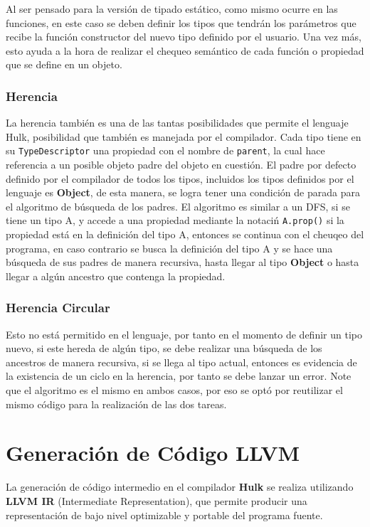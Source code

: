 \documentclass[11pt, a4paper, twoside]{article} %
\begin{document}
Al ser pensado para la versi\'on de tipado est\'atico, como mismo ocurre en las funciones, en este caso se deben definir los tipos que tendr\'an los 
par\'ametros que recibe la funci\'on constructor del nuevo tipo definido por el usuario.  Una vez m\'as, esto ayuda a la hora de realizar el chequeo 
sem\'antico de cada funci\'on o propiedad que se define en un objeto. 

\subsubsection{Herencia}
La herencia tambi\'en es una de las tantas posibilidades que permite el lenguaje Hulk, posibilidad que tambi\'en es manejada por el compilador. Cada tipo
tiene en su \texttt{TypeDescriptor} una propiedad con el nombre de \texttt{parent}, la cual hace referencia a un posible objeto padre del objeto en cuesti\'on.
El padre por defecto definido por el compilador de todos los tipos, incluidos los tipos definidos por el lenguaje es \textbf{Object}, de esta manera, se logra 
tener una condici\'on de parada para el algoritmo de b\'usqueda de los padres. El algoritmo es similar a un DFS, si se tiene un tipo A, y accede a una propiedad
mediante la notaci\'n \texttt{A.prop()} si la propiedad est\'a en la definici\'on del tipo A, entonces se continua con el cheuqeo del programa,
en caso contrario se busca la definici\'on del tipo A y se hace una b\'usqueda de sus padres de manera recursiva, hasta llegar al tipo \textbf{Object} o hasta
llegar a alg\'un ancestro que contenga la propiedad. 


\subsubsection{Herencia Circular}
Esto no est\'a permitido en el lenguaje, por tanto en el momento de definir un tipo nuevo, si este hereda de alg\'un tipo, se debe realizar una b\'usqueda de
los ancestros de manera recursiva, si se llega al tipo actual, entonces es evidencia de la existencia de un ciclo en la herencia, por tanto se debe lanzar un 
error. Note que el algoritmo es el mismo en ambos casos, por eso se opt\'o por reutilizar el mismo c\'odigo para la realizaci\'on de las dos tareas.

\section{Generación de Código LLVM}

La generación de código intermedio en el compilador \textbf{Hulk} se realiza utilizando \textbf{LLVM IR} (Intermediate Representation), que permite producir una representación de bajo nivel optimizable y portable del programa fuente.
\end{document}
